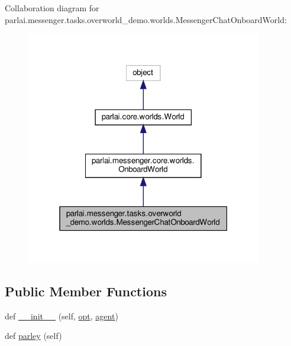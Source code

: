 Collaboration diagram for parlai.\+messenger.\+tasks.\+overworld\+\_\+demo.\+worlds.\+Messenger\+Chat\+Onboard\+World\+:
\nopagebreak
\begin{figure}[H]
\begin{center}
\leavevmode
\includegraphics[width=292pt]{classparlai_1_1messenger_1_1tasks_1_1overworld__demo_1_1worlds_1_1MessengerChatOnboardWorld__coll__graph}
\end{center}
\end{figure}
\subsection*{Public Member Functions}
\begin{DoxyCompactItemize}
\item 
def \hyperlink{classparlai_1_1messenger_1_1tasks_1_1overworld__demo_1_1worlds_1_1MessengerChatOnboardWorld_a47bcd8f3ccb542977672022302dcccba}{\+\_\+\+\_\+init\+\_\+\+\_\+} (self, \hyperlink{classparlai_1_1core_1_1worlds_1_1World_a3640d92718acd3e6942a28c1ab3678bd}{opt}, \hyperlink{classparlai_1_1messenger_1_1tasks_1_1overworld__demo_1_1worlds_1_1MessengerChatOnboardWorld_ae99673acdcb2895473f747dbc433c874}{agent})
\item 
def \hyperlink{classparlai_1_1messenger_1_1tasks_1_1overworld__demo_1_1worlds_1_1MessengerChatOnboardWorld_a6d9015bd3e733fd4cf75e23b688584c1}{parley} (self)
\end{DoxyCompactItemize}
